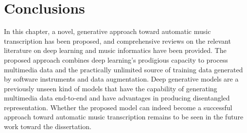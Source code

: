 \section{Conclusions}

In this chapter, a novel, generative approach toward automatic music transcription has been proposed, and comprehensive reviews on the relevant literature on deep learning and music informatics have been provided.
The proposed approach combines deep learning's prodigious capacity to process multimedia data and the practically unlimited source of training data generated by software instruments and data augmentation.
Deep generative models are a previously unseen kind of models that have the capability of generating multimedia data end-to-end and have advantages in producing disentangled representation.
Whether the proposed model can indeed become a successful approach toward automatic music transcription remains to be seen in the future work toward the dissertation.
